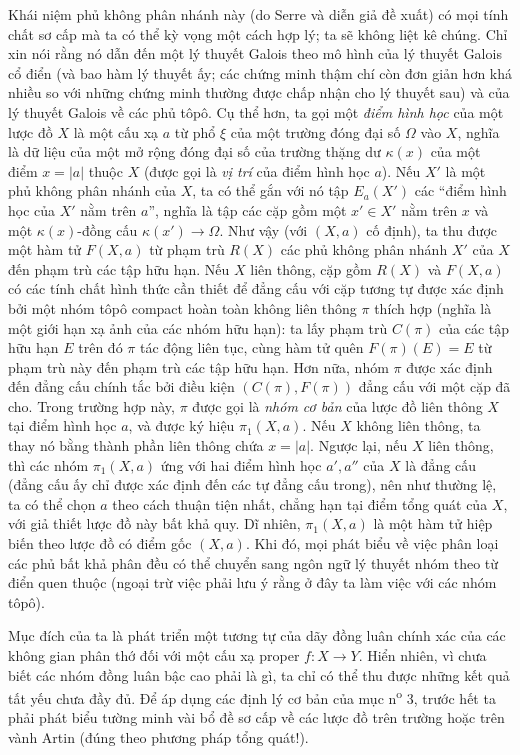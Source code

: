 \documentclass[11pt,twoside,openany]{book}
\numberwithin{equation}{section}
\newcommand{\src}[1]{%
  \phantomsection\hypertarget{src:\fgasourceid:#1}{}%
  \marginpar{\raggedleft\footnotesize\sffamily #1}%
}
\newcommand{\fgasourceid}{unset}
\begin{document}
\src{210}
Khái niệm phủ không phân nhánh này (do Serre và diễn giả đề xuất) có mọi tính
chất sơ cấp mà ta có thể kỳ vọng một cách hợp lý; ta sẽ không liệt kê chúng.
Chỉ xin nói rằng nó dẫn đến một lý thuyết Galois theo mô hình của lý thuyết
Galois cổ điển (và bao hàm lý thuyết ấy; các chứng minh thậm chí còn đơn giản
hơn khá nhiều so với những chứng minh thường được chấp nhận cho lý thuyết sau) và của lý thuyết
Galois về các phủ tôpô. Cụ thể hơn, ta gọi một \emph{điểm hình học} của một
lược đồ $X$ là một cấu xạ $a$ từ phổ $\xi$ của một trường đóng đại số $\Omega$
vào $X$, nghĩa là dữ liệu của một mở rộng đóng đại số của trường thặng dư
$\kappa(x)$ của một điểm $x=|a|$ thuộc $X$ (được gọi là \emph{vị trí} của
điểm hình học $a$). Nếu $X'$ là một phủ không phân nhánh của $X$, ta có thể
gắn với nó tập $E_a(X')$ các “điểm hình học của $X'$ nằm trên $a$”, nghĩa là
tập các cặp gồm một $x'\in X'$ nằm trên $x$ và một $\kappa(x)$-đồng cấu
$\kappa(x')\longrightarrow\Omega$. Như vậy (với $(X,a)$ cố định), ta thu được
một hàm tử $F(X,a)$ từ phạm trù $R(X)$ các phủ không phân nhánh $X'$ của $X$
đến phạm trù các tập hữu hạn. Nếu $X$ liên thông, cặp gồm $R(X)$ và $F(X,a)$
có các tính chất hình thức cần thiết để đẳng cấu với cặp tương tự được xác định
bởi một nhóm tôpô compact hoàn toàn không liên thông $\pi$ thích hợp (nghĩa là
một giới hạn xạ ảnh của các nhóm hữu hạn): ta lấy phạm trù $C(\pi)$ của các tập
hữu hạn $E$ trên đó $\pi$ tác động liên tục, cùng hàm tử quên
$F(\pi)(E)=E$ từ phạm trù này đến phạm trù các tập hữu hạn. Hơn nữa, nhóm
$\pi$ được xác định đến đẳng cấu chính tắc bởi điều kiện $(C(\pi),F(\pi))$
đẳng cấu với một cặp đã cho. Trong trường hợp này, $\pi$ được gọi là
\emph{nhóm cơ bản} của lược đồ liên thông $X$ tại điểm hình học $a$, và được
ký hiệu $\pi_1(X,a)$. Nếu $X$ không liên thông, ta thay nó bằng thành phần liên
thông chứa $x=|a|$. Ngược lại, nếu $X$ liên thông, thì các nhóm $\pi_1(X,a)$
ứng với hai điểm hình học $a',a''$ của $X$ là đẳng cấu (đẳng cấu ấy chỉ được
xác định đến các tự đẳng cấu trong), nên như thường lệ, ta có thể chọn $a$
theo cách thuận tiện nhất, chẳng hạn tại điểm tổng quát của $X$, với giả thiết
lược đồ này bất khả quy. Dĩ nhiên, $\pi_1(X,a)$ là một hàm tử hiệp biến theo lược
đồ có điểm gốc $(X,a)$. Khi đó, mọi phát biểu về việc phân loại các phủ bất
khả phân đều có thể chuyển sang ngôn ngữ lý thuyết nhóm theo từ điển quen thuộc
(ngoại trừ việc phải lưu ý rằng ở đây ta làm việc với các nhóm tôpô).

\src{211}
Mục đích của ta là phát triển một tương tự của dãy đồng luân chính xác của các
không gian phân thớ đối với một cấu xạ proper $f:X\longrightarrow Y$. Hiển
nhiên, vì chưa biết các nhóm đồng luân bậc cao phải là gì, ta chỉ có thể thu
được những kết quả tất yếu chưa đầy đủ. Để áp dụng các định lý cơ bản của
mục n\textsuperscript{o} 3, trước hết ta phải phát biểu tường minh vài bổ đề sơ cấp về các lược đồ
trên trường hoặc trên vành Artin (đúng theo phương pháp tổng quát!).
\end{document}
